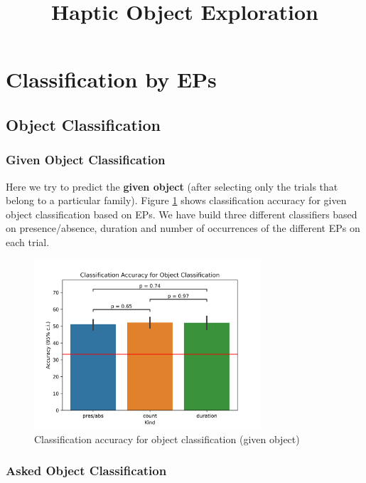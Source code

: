 \documentclass{article}
\title{Haptic Object Exploration}
\date{}
\begin{document}
\maketitle %

\section*{Classification by EPs}

\subsection*{Object Classification}
\subsubsection*{Given Object Classification}
Here we try to predict the \textbf{given object} (after selecting only the trials that belong to a particular family). Figure \ref{ep_giv_obj_class_acc} shows classification accuracy for given object classification based on EPs. We have build three different classifiers based on presence/absence, duration and number of occurrences of the different EPs on each trial. 

\begin{figure}[!h]
\begin{centering}
\includegraphics[width=0.75\textwidth]{./figures/EP_obj_class_acc.png}
\caption{Classification accuracy for object classification (given object)}
\label{ep_giv_obj_class_acc}
\end{centering}
\end{figure} 

\subsubsection*{Asked Object Classification}
\end{document}
